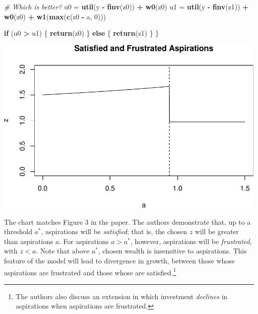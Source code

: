 \documentclass[]{article}
\newenvironment{Shaded}{\begin{snugshade}}{\end{snugshade}}
\newcommand{\KeywordTok}[1]{\textcolor[rgb]{0.13,0.29,0.53}{\textbf{#1}}}
\newcommand{\DecValTok}[1]{\textcolor[rgb]{0.00,0.00,0.81}{#1}}
\newcommand{\StringTok}[1]{\textcolor[rgb]{0.31,0.60,0.02}{#1}}
\newcommand{\CommentTok}[1]{\textcolor[rgb]{0.56,0.35,0.01}{\textit{#1}}}
\newcommand{\ControlFlowTok}[1]{\textcolor[rgb]{0.13,0.29,0.53}{\textbf{#1}}}
\newcommand{\OperatorTok}[1]{\textcolor[rgb]{0.81,0.36,0.00}{\textbf{#1}}}
\newcommand{\NormalTok}[1]{#1}
\begin{document}
\begin{Shaded}
\begin{Highlighting}[]
  \CommentTok{# Which is better?}
\NormalTok{  u0 =}\StringTok{ }\KeywordTok{util}\NormalTok{(y }\OperatorTok{-}\StringTok{ }\KeywordTok{finv}\NormalTok{(z0)) }\OperatorTok{+}\StringTok{ }\KeywordTok{w0}\NormalTok{(z0)}
\NormalTok{  u1 =}\StringTok{ }\KeywordTok{util}\NormalTok{(y }\OperatorTok{-}\StringTok{ }\KeywordTok{finv}\NormalTok{(z1)) }\OperatorTok{+}\StringTok{ }\KeywordTok{w0}\NormalTok{(z0) }\OperatorTok{+}\StringTok{ }\KeywordTok{w1}\NormalTok{(}\KeywordTok{max}\NormalTok{(}\KeywordTok{c}\NormalTok{(z0 }\OperatorTok{-}\StringTok{ }\NormalTok{a, }\DecValTok{0}\NormalTok{)))}
  
  \ControlFlowTok{if}\NormalTok{ (u0 }\OperatorTok{>}\StringTok{ }\NormalTok{u1) \{}
    \KeywordTok{return}\NormalTok{(z0)}
\NormalTok{  \} }\ControlFlowTok{else}\NormalTok{ \{}
    \KeywordTok{return}\NormalTok{(z1)}
\NormalTok{  \}}
\NormalTok{\}}
\end{Highlighting}
\end{Shaded}

\includegraphics{genicot_ray_notes_files/figure-latex/unnamed-chunk-3-1.pdf}

The chart matches Figure 3 in the paper. The authors demonstrate that,
up to a threshold \(a^*\), aspirations will be \emph{satisfied}; that
is, the chosen \(z\) will be greater than aspirations \(a\). For
aspirations \(a>a^*\), however, aspirations will be \emph{frustrated},
with \(z<a\). Note that above \(a^*\), chosen wealth is insensitive to
aspirations. This feature of the model will lead to divergence in
growth, between those whose aspirations are frustrated and those whose
are satisfied.\footnote{The authors also discuss an extension in which
  investment \emph{declines} in aspirations when aspirations are
  frustrated.}
\end{document}
